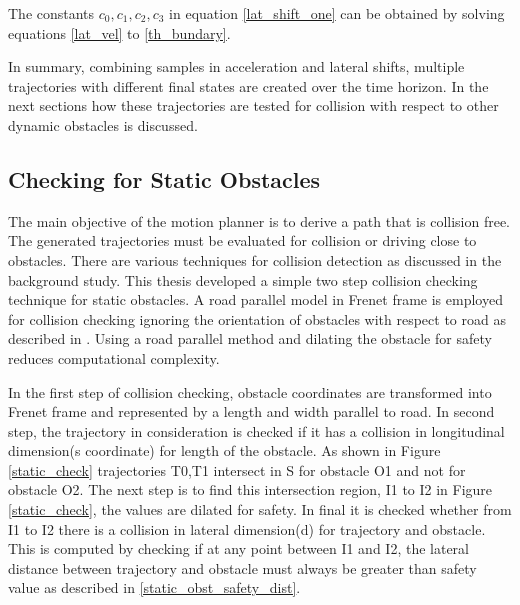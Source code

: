 

The constants $ { c_0,c_1,c_2,c_3}  $ in equation \ref{lat_shift_one} can be obtained by solving equations \ref{lat_vel} to \ref{th_bundary}.

In summary, combining samples in acceleration and lateral shifts, multiple trajectories with different final states are created over the time horizon. In the next sections how these trajectories are tested for collision with respect to other dynamic obstacles is discussed. 



\subsection{Checking for Static Obstacles} \label{osbtacle_check_satic}
The main objective of the motion planner is to derive a path that is collision free. The generated trajectories must be evaluated for collision or driving close to obstacles. There are various techniques for collision detection as discussed in the background study. This thesis developed a simple two step collision checking technique for static obstacles. A road parallel model in Frenet frame is employed for collision checking ignoring the orientation of obstacles with respect to road as described in \cite{cmu_parallel_thesis}. Using a road parallel method and dilating the obstacle for safety reduces computational complexity. 


In the first step of collision checking, obstacle coordinates are transformed into Frenet frame and represented by a length and width parallel to road. In second step, the trajectory in consideration is checked if it has a collision in longitudinal dimension(s coordinate) for length of the obstacle. As shown in Figure \ref{static_check} trajectories T0,T1 intersect in S for obstacle O1 and not for obstacle O2. The next step is to find this intersection region, I1 to I2 in Figure \ref{static_check}, the values are dilated for safety. In final it is checked whether from I1 to I2 there is a collision in lateral dimension(d) for trajectory and obstacle. This is computed by checking if at any point between I1 and I2, the lateral distance between trajectory and obstacle must always be greater than safety value as described in \ref{static_obst_safety_dist}. 

